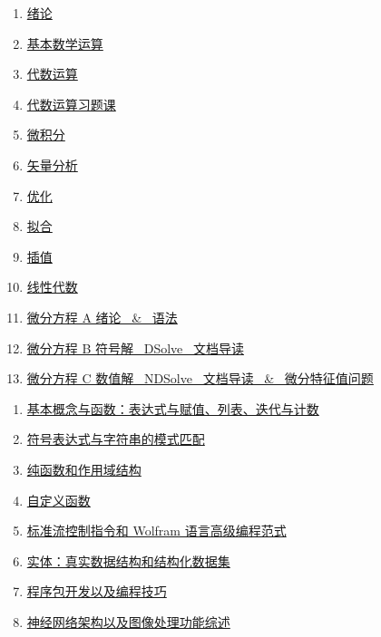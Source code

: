 \documentclass[11pt]{article}
\begin{document}
\begin{multicols}{2}
	\begin{enumerate}
		\item  \href{https://mp.weixin.qq.com/s/vYx6pka6K9ikLSgcRfzJtQ}{绪论} %
		\item  \href{https://mp.weixin.qq.com/s/MwU5AKH8KVgBctNnYlnkXw}{基本数学运算} %
		\item  \href{https://mp.weixin.qq.com/s/L95HcEuH4HCHBhKwBd6azg}{代数运算} %
		\item  \href{https://mp.weixin.qq.com/s/Z_VAuRKu2GN7hmFvptoFSg}{代数运算习题课} %
		\item  \href{https://mp.weixin.qq.com/s/BZ6Z5tSLeoT52d69By80Ow}{微积分} %
		\item  \href{https://mp.weixin.qq.com/s/ngAuravDc4KWF22gXzYegQ}{矢量分析} %
		\item  \href{https://mp.weixin.qq.com/s/w7A7OhPfpGvNMaLfajgYYQ}{优化} %
		\item  \href{https://mp.weixin.qq.com/s/e9Y7wM3-M40HoJc4hZMpvA}{拟合} %
		\item  \href{https://mp.weixin.qq.com/s/djpFqzcafvxSH7nXtyuF2w}{插值} %
		\item  \href{https://mp.weixin.qq.com/s/L7z4vrNeOKWhXAUEFLDTSw}{线性代数} %
		\item  \href{https://mp.weixin.qq.com/s/rL9oXhfXBXeXwoLLEmHuuA}{微分方程 A 绪论 \ \& \ 语法} %
		\item  \href{https://mp.weixin.qq.com/s/ixqqvCjuPC-EIJzgpS4h5w}{微分方程 B 符号解 \ DSolve \ 文档导读} %
		\item  \href{https://mp.weixin.qq.com/s/ruo4Sbxuj_YQYXSB_20J-A}{微分方程 C 数值解 \ NDSolve \ 文档导读 \ \& \ 微分特征值问题} %
	\end{enumerate}
\end{multicols}


\begin{enumerate}
	\item \href{https://mp.weixin.qq.com/s/8DccoBGCcHBEUBcuR4Md1Q}{基本概念与函数：表达式与赋值、列表、迭代与计数}
	\item \href{https://mp.weixin.qq.com/s/VSifYvOLxzpsJv-yMT26Eg}{符号表达式与字符串的模式匹配}
	\item \href{https://mp.weixin.qq.com/s/dbeYkHJn1YResBJITcuYvg}{纯函数和作用域结构}
	\item \href{https://mp.weixin.qq.com/s/gVkQkfdyeW5iWZ34YVHSFg}{自定义函数}
	\item \href{https://mp.weixin.qq.com/s/EPdKtkx5UVTY9YD7tbS6tQ}{标准流控制指令和 Wolfram 语言高级编程范式}
	\item \href{https://mp.weixin.qq.com/s/xw7YMPqBhYnFrqIRhNBcww}{实体：真实数据结构和结构化数据集}
	\item \href{https://mp.weixin.qq.com/s/MwJnqKCDPz8zaJrjv6iJtA}{程序包开发以及编程技巧}
	\item \href{https://mp.weixin.qq.com/s/1bx9DPkJIpW6e8DqkHI3TA}{神经网络架构以及图像处理功能综述}
\end{enumerate}
\end{document}
